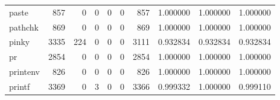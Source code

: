 \begin{longtable}{lrrrrrrrrr}
paste     &                                 857 &                                               0 &                                              0 &                                             0 &                                              0 &                                          857 &                                           1.000000 &                               1.000000 &                             1.000000 \\
pathchk   &                                 869 &                                               0 &                                              0 &                                             0 &                                              0 &                                          869 &                                           1.000000 &                               1.000000 &                             1.000000 \\
pinky     &                                3335 &                                             224 &                                              0 &                                             0 &                                              0 &                                         3111 &                                           0.932834 &                               0.932834 &                             0.932834 \\
pr        &                                2854 &                                               0 &                                              0 &                                             0 &                                              0 &                                         2854 &                                           1.000000 &                               1.000000 &                             1.000000 \\
printenv  &                                 826 &                                               0 &                                              0 &                                             0 &                                              0 &                                          826 &                                           1.000000 &                               1.000000 &                             1.000000 \\
printf    &                                3369 &                                               0 &                                              3 &                                             0 &                                              0 &                                         3366 &                                           0.999332 &                               1.000000 &                             0.999110 \\

\end{longtable}
